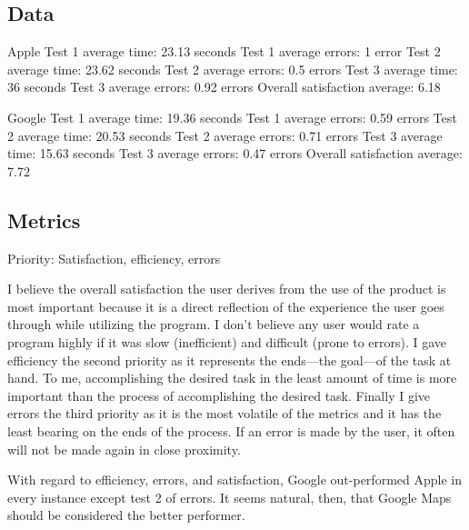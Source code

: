 \documentclass[12pt, oneside]{article}
\begin{document}
\subsection{Data}


Apple
Test 1 average time: 23.13 seconds
Test 1 average errors: 1 error
Test 2 average time: 23.62 seconds
Test 2 average errors: 0.5 errors 
Test 3 average time: 36 seconds
Test 3 average errors: 0.92 errors
Overall satisfaction average: 6.18

Google
Test 1 average time: 19.36 seconds
Test 1 average errors: 0.59 errors
Test 2 average time: 20.53 seconds
Test 2 average errors: 0.71 errors 
Test 3 average time: 15.63 seconds
Test 3 average errors: 0.47 errors
Overall satisfaction average: 7.72

\subsection{Metrics}

Priority: Satisfaction, efficiency, errors

I believe the overall satisfaction the user derives from the use of the product is most important because it is a direct reflection of the experience the user goes through while utilizing the program. I don't believe any user would rate a program highly if it was slow (inefficient) and difficult (prone to errors). %
I gave efficiency the second priority as it represents the ends---the goal---of the task at hand. To me, accomplishing the desired task in the least amount of time is more important than the process of accomplishing the desired task. Finally I give errors the third priority as it is the most volatile of the metrics and it has the least bearing on the ends of the process. If an error is made by the user, it often will not be made again in close proximity. %

With regard to efficiency, errors, and satisfaction, Google out-performed Apple in every instance except test 2 of errors. It seems natural, then, that Google Maps should be considered the better performer.
\end{document}
